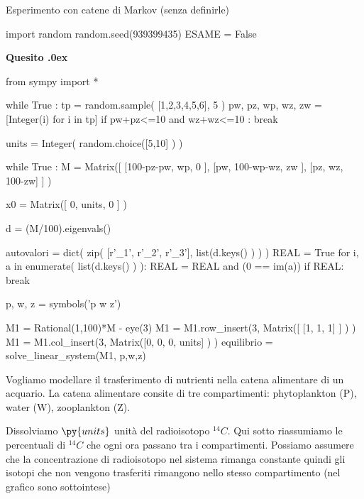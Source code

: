 \documentclass[11pt,twoside,a4paper]{article}
\newcounter{quesito}
\newenvironment{question}{\bigskip\addtocounter{quesito}{1}\bigskip\bigskip\par\textbf{Quesito \thequesito.\kern0ex}}{\par\vspace{\parskip}}
\begin{document}
\colorbox{blue!10}{\begin{minipage}{\textwidth}
Esperimento con catene di Markov (senza definirle)

\end{minipage}}


\begin{pycode}
import random
random.seed(939399435)
ESAME = False
\end{pycode}


\begin{question}
\def\Pr{{\rm Pr\,}}
\def\pyl#1{\py{latex(#1)}}
\everymath{\displaystyle}
\def\nicefrac#1#2{#1/#2}
\renewcommand{\arraystretch}{1.3}
\begin{pycode}
from sympy import *

while True :
    tp  =  random.sample( [1,2,3,4,5,6], 5 ) 
    pw, pz, wp, wz, zw = [Integer(i) for i in tp] 
    if pw+pz<=10 and wz+wz<=10 : break 
    
units = Integer( random.choice([5,10] ) )

while True :
    M = Matrix([ [100-pz-pw, wp,        0     ],
                 [pw,        100-wp-wz, zw    ],
                 [pz,        wz,        100-zw] ] )

    x0 = Matrix([ 0, units, 0 ] )

    d = (M/100).eigenvals()

    autovalori = dict( zip( [r'\lambda_1', r'\lambda_2', r'\lambda_3'], 
                           list(d.keys() ) ) )
    REAL = True
    for i, a in enumerate( list(d.keys() ) ):
        REAL = REAL and (0 == im(a))
    if REAL: break

p, w, z = symbols('p w z')


M1 = Rational(1,100)*M - eye(3)
M1 = M1.row_insert(3, Matrix([ [1, 1, 1] ] ) )
M1 = M1.col_insert(3, Matrix([0, 0, 0, units] ) )
equilibrio = solve_linear_system(M1, p,w,z)

\end{pycode}
Vogliamo modellare il trasferimento di nutrienti nella catena alimentare di un acquario. La catena alimentare consite di tre compartimenti: phytoplankton ({\sf P}), water ({\sf W}), zooplankton ({\sf Z}).

Dissolviamo $\py{units}$ unità del radioisotopo $^{14}C$. Qui sotto riassumiamo le percentuali di $^{14}C$ che ogni ora passano tra i compartimenti. Possiamo assumere che la concentrazione di radioisotopo nel sistema rimanga constante quindi gli isotopi che non vengono trasferiti rimangono nello stesso compartimento (nel grafico sono sottointese)


\end{question}
\end{document}
